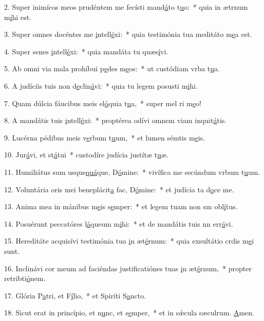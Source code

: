 2. Super inimícos meos prudéntem me fecísti mand\uline{á}to t\uline{u}o:~* quia in ætrnum m\uline{i}hi est.\par 
3. Super omnes docéntes me \uline{i}ntell\uline{é}xi:~* quia testimónia tua meditáto m\uline{e}a est.\par 
4. Super senes \uline{i}ntell\uline{é}xi:~* quia mandáta tu quæs\uline{í}vi.\par 
5. Ab omni via mala prohíbui p\uline{e}des m\uline{e}os:~* ut custódiam vrba t\uline{u}a.\par 
6. A judíciis tuis non d\uline{e}clin\uline{á}vi:~* quia tu legem posusti m\uline{i}hi.\par 
7. Quam dúlcia fáucibus meis el\uline{ó}quia t\uline{u}a,~* super mel ri m\uline{e}o!\par 
8. A mandátis tuis \uline{i}ntell\uline{é}xi:~* proptérea odívi omnem viam inquit\uline{á}tis.\par 
9. Lucérna pédibus meis v\uline{e}rbum t\uline{u}um,~* et lumen sémtis m\uline{e}is.\par 
10. Jur\uline{á}vi, et st\uline{á}tui~* custodíre judícia justítæ t\uline{u}æ.\par 
11. Humiliátus sum usque\uline{quá}que, D\uline{ó}mine:~* vivífica me secúndum vrbum t\uline{u}um.\par 
12. Voluntária oris mei beneplácit\uline{a} fac, D\uline{ó}mine:~* et judícia ta d\uline{o}ce me.\par 
13. Anima mea in mánibus m\uline{e}is s\uline{e}mper:~* et legem tuam non sm obl\uline{í}tus.\par 
14. Posuérunt peccatóres l\uline{á}queum m\uline{i}hi:~* et de mandátis tuis nn err\uline{á}vi.\par 
15. Hereditáte acquisívi testimónia tua \uline{i}n æt\uline{é}rnum:~* quia exsultátio crdis m\uline{e}i sunt.\par 
16. Inclinávi cor meum ad faciéndas justificatiónes tuas \uline{i}n æt\uline{é}rnum,~* propter retribti\uline{ó}nem.\par 
17. Glória P\uline{a}tri, et F\uline{í}lio,~* et Spiríti S\uline{a}ncto.\par 
18. Sicut erat in princípio, et n\uline{u}nc, et s\uline{e}mper,~* et in sǽcula sæculrum. \uline{A}men.\par 
